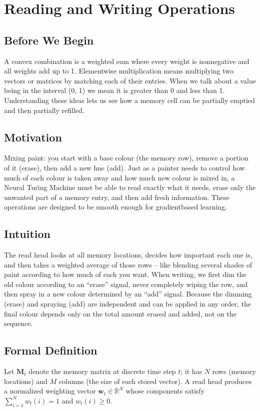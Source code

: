 \documentclass[12pt, a4paper]{article}
\begin{document}
\section{Reading and Writing Operations}

\subsection{Before We Begin}
A convex combination is a weighted sum where every weight is nonnegative and all weights add up to 1.  
Elementwise multiplication means multiplying two vectors or matrices by matching each of their entries.  
When we talk about a value being in the interval (0, 1) we mean it is greater than 0 and less than 1.  
Understanding these ideas lets us see how a memory cell can be partially emptied and then partially refilled.

\subsection{Motivation}
Mixing paint: you start with a base colour (the memory row), remove a portion of it (erase), then add a new hue (add).  
Just as a painter needs to control how much of each colour is taken away and how much new colour is mixed in, a Neural Turing Machine must be able to read exactly what it needs, erase only the unwanted part of a memory entry, and then add fresh information.  
These operations are designed to be smooth enough for gradientbased learning.

\subsection{Intuition}
The read head looks at all memory locations, decides how important each one is, and then takes a weighted average of those rows -- like blending several shades of paint according to how much of each you want.  
When writing, we first dim the old colour according to an ``erase'' signal, never completely wiping the row, and then spray in a new colour determined by an ``add'' signal.  
Because the dimming (erase) and spraying (add) are independent and can be applied in any order, the final colour depends only on the total amount erased and added, not on the sequence.

\subsection{Formal Definition}
Let \(\mathbf{M}_t\) denote the memory matrix at discrete time step \(t\); it has \(N\) rows (memory locations) and \(M\) columns (the size of each stored vector).  
A read head produces a normalized weighting vector \(\mathbf{w}_t\in\mathbb{R}^N\) whose components satisfy \(\sum_{i=1}^{N} w_t(i)=1\) and \(w_t(i)\ge 0\).  
\end{document}
